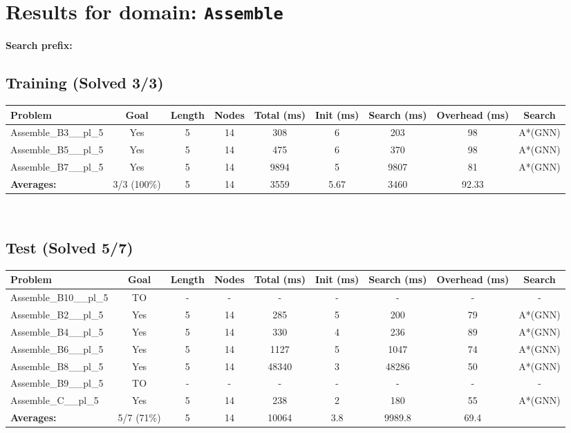 \documentclass{article}
\begin{document}
\section*{Results for domain: \texttt{Assemble}}
\textbf{Search prefix:} 
\\[0.5cm]
\subsection*{Training (Solved 3/3)}
\begin{tabular}{lcccccccc}
\toprule
Problem & Goal & Length & Nodes & Total (ms) & Init (ms) & Search (ms) & Overhead (ms) & Search \\
\midrule
Assemble\_B3\_\_pl\_5 & Yes & 5 & 14 & 308 & 6 & 203 & 98 & A*(GNN) \\
Assemble\_B5\_\_pl\_5 & Yes & 5 & 14 & 475 & 6 & 370 & 98 & A*(GNN) \\
Assemble\_B7\_\_pl\_5 & Yes & 5 & 14 & 9894 & 5 & 9807 & 81 & A*(GNN) \\
\textbf{Averages:} & 3/3 (100\%) & 5 & 14 & 3559 & 5.67 & 3460 & 92.33 & \\
\bottomrule
\end{tabular}
\\[0.7cm]
\subsection*{Test (Solved 5/7)}
\begin{tabular}{lcccccccc}
\toprule
Problem & Goal & Length & Nodes & Total (ms) & Init (ms) & Search (ms) & Overhead (ms) & Search \\
\midrule
Assemble\_B10\_\_pl\_5 & TO & - & - & - & - & - & - & - \\
Assemble\_B2\_\_pl\_5 & Yes & 5 & 14 & 285 & 5 & 200 & 79 & A*(GNN) \\
Assemble\_B4\_\_pl\_5 & Yes & 5 & 14 & 330 & 4 & 236 & 89 & A*(GNN) \\
Assemble\_B6\_\_pl\_5 & Yes & 5 & 14 & 1127 & 5 & 1047 & 74 & A*(GNN) \\
Assemble\_B8\_\_pl\_5 & Yes & 5 & 14 & 48340 & 3 & 48286 & 50 & A*(GNN) \\
Assemble\_B9\_\_pl\_5 & TO & - & - & - & - & - & - & - \\
Assemble\_C\_\_pl\_5 & Yes & 5 & 14 & 238 & 2 & 180 & 55 & A*(GNN) \\
\textbf{Averages:} & 5/7 (71\%) & 5 & 14 & 10064 & 3.8 & 9989.8 & 69.4 & \\
\bottomrule
\end{tabular}
\\[0.7cm]
\end{document}
